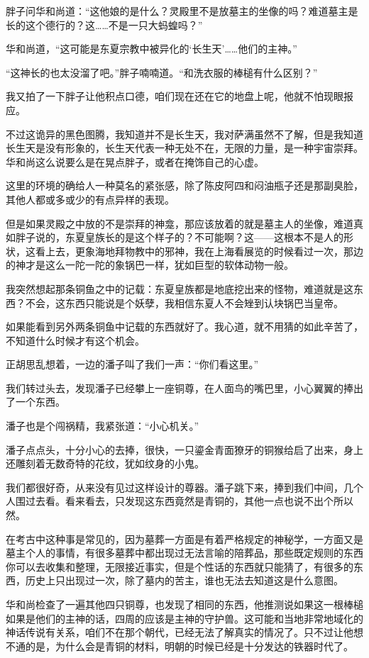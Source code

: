 胖子问华和尚道：“这他娘的是什么？灵殿里不是放墓主的坐像的吗？难道墓主是长的这个德行的？这……不是一只大蚂蝗吗？”

华和尚道，“这可能是东夏宗教中被异化的‘长生天’……他们的主神。”

“这神长的也太没溜了吧。”胖子喃喃道。“和洗衣服的棒槌有什么区别？”

我又拍了一下胖子让他积点口德，咱们现在还在它的地盘上呢，他就不怕现眼报应。

不过这诡异的黑色图腾，我知道并不是长生天，我对萨满虽然不了解，但是我知道长生天是没有形象的，长生天代表一种无处不在，无限的力量，是一种宇宙崇拜。华和尚这么说要么是在晃点胖子，或者在掩饰自己的心虚。

这里的环境的确给人一种莫名的紧张感，除了陈皮阿四和闷油瓶子还是那副臭脸，其他人都或多或少的有点异样的表现。

但是如果灵殿之中放的不是崇拜的神龛，那应该放着的就是墓主人的坐像，难道真如胖子说的，东夏皇族长的是这个样子的？不可能啊？这——这根本不是人的形状，这看上去，更象海地拜物教中的邪神，我在上海看展览的时候看过一次，那边的神才是这么一陀一陀的象锅巴一样，犹如巨型的软体动物一般。

我突然想起那条铜鱼之中的记载：东夏皇族都是地底挖出来的怪物，难道就是这东西？不会，这东西只能说是个妖孽，我相信东夏人不会矬到认块锅巴当皇帝。

如果能看到另外两条铜鱼中记载的东西就好了。我心道，就不用猜的如此辛苦了，不知道什么时候才有这个机会。

正胡思乱想着，一边的潘子叫了我们一声：“你们看这里。”

我们转过头去，发现潘子已经攀上一座铜尊，在人面鸟的嘴巴里，小心翼翼的捧出了一个东西。

潘子也是个闯祸精，我紧张道：“小心机关。”

潘子点点头，十分小心的去捧，很快，一只鎏金青面獠牙的铜猴给启了出来，身上还雕刻着无数奇特的花纹，犹如纹身的小鬼。

我们都很好奇，从来没有见过这样设计的尊器。潘子跳下来，捧到我们中间，几个人围过去看。看来看去，只发现这东西竟然是青铜的，其他一点也说不出个所以然。

在考古中这种事是常见的，因为墓葬一方面是有着严格规定的神秘学，一方面又是墓主个人的事情，有很多墓葬中都出现过无法言喻的陪葬品，那些既定规则的东西你可以去收集和整理，无限接近事实，但是个性话的东西就只能猜了，有很多的东西，历史上只出现过一次，除了墓内的苦主，谁也无法去知道这是什么意图。

华和尚检查了一遍其他四只铜尊，也发现了相同的东西，他推测说如果这一根棒槌如果是他们的主神的话，四周的应该是主神的守护兽。这可能和当地非常地域化的神话传说有关系，咱们不在那个朝代，已经无法了解真实的情况了。只不过让他想不通的是，为什么会是青铜的材料，明朝的时候已经是十分发达的铁器时代了。

